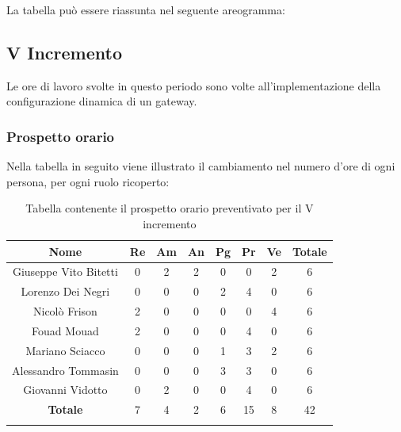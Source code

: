 			La tabella può essere riassunta nel seguente areogramma:
		


		
		\subsection{V Incremento}
		Le ore di lavoro svolte in questo periodo sono volte all'implementazione della configurazione dinamica di un gateway.
		\subsubsection{Prospetto orario}
			Nella tabella in seguito viene illustrato il cambiamento nel numero d'ore di ogni persona, per ogni ruolo ricoperto:
			
			\begin{longtable}{|c|c|c|c|c|c|c|c}
				\hline
				\rowcolor{lighter-grayer}
				\textbf{Nome} & \textbf{Re} & \textbf{Am} & \textbf{An} & \textbf{Pg}  & \textbf{Pr}   & \textbf{Ve} & \textbf{Totale} \\
				\hline
				\endfirsthead
				\hline
				Giuseppe Vito Bitetti & 0 & 2 & 2 & 0 & 0 & 2 & 6\\
				\hline
				\hline
				Lorenzo Dei Negri & 0 & 0 & 0 & 2 & 4 & 0 & 6\\
				\hline
				\hline
				Nicolò Frison & 2 & 0 & 0 & 0 & 0 & 4 & 6\\
				\hline
				\hline
				Fouad Mouad & 2 & 0 & 0 & 0 & 4 & 0 & 6\\
				\hline
				\hline
				Mariano Sciacco & 0 & 0 & 0 & 1 & 3 & 2 & 6\\
				\hline
				\hline
				Alessandro Tommasin & 0 & 0 & 0 & 3 & 3 & 0 & 6\\
				\hline
				\hline
				Giovanni Vidotto & 0 & 2 & 0 & 0 & 4 & 0 & 6\\
				\hline 
				\textbf{Totale} & 7 & 4 & 2 & 6 & 15 & 8 & 42 \\
				\hline 
				
				\caption{Tabella contenente il prospetto orario preventivato per il V incremento}
			\end{longtable}
			\pagebreak	
			
